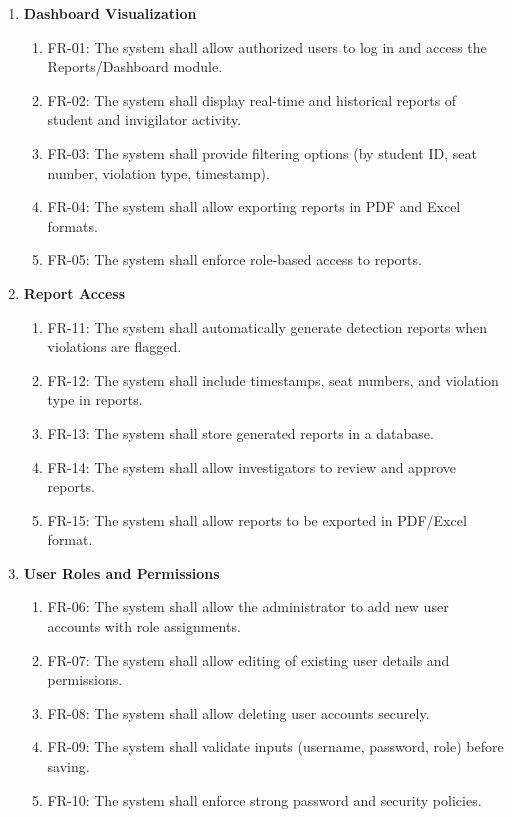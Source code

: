 \begin{enumerate}
    \item \textbf{Dashboard Visualization}
    \begin{enumerate}[label=(\alph*)]
        \item FR-01: The system shall allow authorized users to log in and access the Reports/Dashboard module.
        \item FR-02: The system shall display real-time and historical reports of student and invigilator activity.
        \item FR-03: The system shall provide filtering options (by student ID, seat number, violation type, timestamp).
        \item FR-04: The system shall allow exporting reports in PDF and Excel formats.
        \item FR-05: The system shall enforce role-based access to reports.
    \end{enumerate}

    \item \textbf{Report Access}
    \begin{enumerate}[label=(\alph*)]
        \item FR-11: The system shall automatically generate detection reports when violations are flagged.
        \item FR-12: The system shall include timestamps, seat numbers, and violation type in reports.
        \item FR-13: The system shall store generated reports in a database.
        \item FR-14: The system shall allow investigators to review and approve reports.
        \item FR-15: The system shall allow reports to be exported in PDF/Excel format.
    \end{enumerate}

    \item \textbf{User Roles and Permissions}
    \begin{enumerate}[label=(\alph*)]
        \item FR-06: The system shall allow the administrator to add new user accounts with role assignments.
        \item FR-07: The system shall allow editing of existing user details and permissions.
        \item FR-08: The system shall allow deleting user accounts securely.
        \item FR-09: The system shall validate inputs (username, password, role) before saving.
        \item FR-10: The system shall enforce strong password and security policies.
    \end{enumerate}
\end{enumerate}


